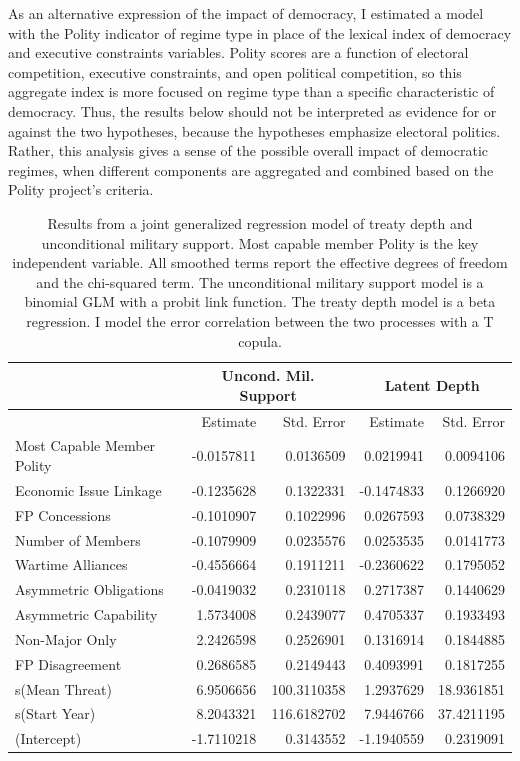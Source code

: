 \documentclass[12pt]{article}
\begin{document}
As an alternative expression of the impact of democracy, I estimated a model with the Polity indicator of regime type in place of the lexical index of democracy and executive constraints variables. 
Polity scores are a function of electoral competition, executive constraints, and open political competition, so this aggregate index is more focused on regime type than a specific characteristic of democracy. 
Thus, the results below should not be interpreted as evidence for or against the two hypotheses, because the hypotheses emphasize electoral politics.
Rather, this analysis gives a sense of the possible overall impact of democratic regimes, when different components are aggregated and combined based on the Polity project's criteria. 


\begin{table}[ht]
\centering
\begin{tabular}{lrrrr}
  & \multicolumn{2}{c}{Uncond. Mil. Support} & \multicolumn{2}{c}{Latent Depth}\\ \hline
 & Estimate & Std. Error & Estimate & Std. Error\\ 
  \hline
  Most Capable Member Polity & -0.0157811 & 0.0136509 & 0.0219941 & 0.0094106 \\ 
  Economic Issue Linkage & -0.1235628 & 0.1322331 & -0.1474833 & 0.1266920 \\ 
  FP Concessions & -0.1010907 & 0.1022996 & 0.0267593 & 0.0738329 \\ 
  Number of Members & -0.1079909 & 0.0235576 & 0.0253535 & 0.0141773 \\ 
  Wartime Alliances & -0.4556664 & 0.1911211 & -0.2360622 & 0.1795052 \\ 
  Asymmetric Obligations & -0.0419032 & 0.2310118 & 0.2717387 & 0.1440629 \\ 
  Asymmetric Capability & 1.5734008 & 0.2439077 & 0.4705337 & 0.1933493 \\ 
  Non-Major Only & 2.2426598 & 0.2526901 & 0.1316914 & 0.1844885 \\ 
  FP Disagreement & 0.2686585 & 0.2149443 & 0.4093991 & 0.1817255 \\ 
  s(Mean Threat) & 6.9506656 & 100.3110358 & 1.2937629 & 18.9361851 \\ 
  s(Start Year) & 8.2043321 & 116.6182702 & 7.9446766 & 37.4211195 \\ 
  (Intercept) & -1.7110218 & 0.3143552 & -1.1940559 & 0.2319091 \\ 
   \hline
\end{tabular}
\caption{Results from a joint generalized regression model of treaty depth and unconditional military support. 
          Most capable member Polity is the key independent variable. 
                     All smoothed terms report the effective degrees of freedom and the chi-squared term. 
                     The unconditional military support model is a binomial GLM with a probit link function. 
                     The treaty depth model is a beta regression. 
                     I model the error correlation between the two processes with a T copula.} 
\label{tab:gjrm-res-agg}
\end{table}
\end{document}

